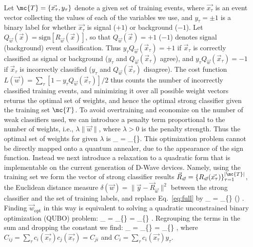 Let $\mc{T} = \{\vec{x_\tau}, y_\tau\}$ denote a given set of training events, where $\vec{x_\tau}$ is an event vector collecting the values of each of the variables we use, and $y_\tau =\pm 1$ is a binary label for whether $\vec{x_\tau}$ is signal ($+1$) or background ($-1$). Let $Q_{\vec{w}}(\vec{x}) = \mathrm{sign}[R_{\vec{w}}(\vec{x})]$, so that $Q_{\vec{w}}(\vec{x})=+1$ ($-1$) denotes signal (background) event classification. Thus $y_\tau Q_{\vec{w}}(\vec{x}_{\tau})=+1$ if $\vec{x}_{\tau}$ is correctly classified as signal or background ($y_\tau$ and $Q_{\vec{w}}(\vec{x}_{\tau})$ agree), and $y_\tau Q_{\vec{w}}(\vec{x}_{\tau})=-1$ if $\vec{x}_{\tau}$ is incorrectly classified ($y_\tau$ and $Q_{\vec{w}}(\vec{x}_{\tau})$ disagree). The cost function $L(\vec{w}) = \sum_{\tau} [1-y_\tau Q_{\vec{w}}(\vec{x}_{\tau})]/2$ thus counts the number of incorrectly classified training events, and minimizing it over all possible weight vectors returns the optimal set of weights, and hence the optimal strong classifier given the training set $\mc{T}$. To avoid overtraining and economize on the number of weak classifiers used, we can introduce a penalty term proportional to the number of weights, i.e., $\lambda \|\vec{w}\|$, where $\lambda>0$ is the penalty strength. Thus the optimal set of weights for given $\lambda$ is
\beq
{}_{} = _{\{\}} .
\label{eq:full}
\eeq
This optimization problem cannot be directly mapped onto a quantum annealer, due to the appearance of the sign function. 
Instead we next introduce a relaxation to a quadratic form that is implementable on the current generation of D-Wave devices. Namely, using the training set we form the vector of strong classifier results $\vec{R}_{\vec{w}} = \{R_{\vec{w}}(\vec{x_\tau})\}_{\tau=1}^{|\mc{T}|}$, the Euclidean distance measure $\delta(\vec{w})=\|\vec{y}-\vec{R}_{\vec{w}}\|^2$ between the strong classifier and the set of training labels, and replace Eq.~\eqref{eq:full} by
\beq
{}_{\min} = _{\{\}} \delta() .
\eeq
Finding $\vec{w}_{\mathrm{opt}}$ in this way is equivalent to solving a quadratic unconstrained binary optimization (QUBO) problem:
\beq
{}_{\min}  = _{\{\}} 
		=  _{\{\}}  .
\eeq
Regrouping the terms in the sum and dropping the constant we find:
\beq
{}_{\min}  = _{\{\}} 
 		 =  _{\{\}}  ,
		\label{eq:wopt1}
\eeq
where $C_{ij} = \sum_\tau c_i(\vec{x_\tau})c_j(\vec{x_\tau}) = C_{ji}$ and $C_i = \sum_\tau c_i(\vec{x_\tau}) y_\tau$. 


